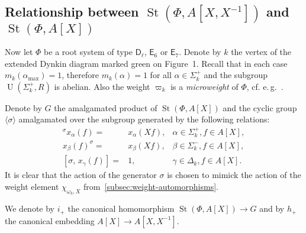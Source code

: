 \documentclass[oneside, 10pt]{amsart}
\DeclareMathOperator{\St}{St}
\DeclareMathOperator{\UU}{U}
\newcommand{\rD}{\mathsf{D}}
\newcommand{\rE}{\mathsf{E}}
\newcommand{\inv}{^{-1}}
\numberwithin{equation}{section}
\numberwithin{thm}{section}
\numberwithin{lemma}{section}
\theoremstyle{definition}
\theoremstyle{remark}
\begin{document}
\subsection{Relationship between \texorpdfstring{$\St(\Phi, A[X, X\inv])$}{St(Ф, A[X, X⁻¹])} and \texorpdfstring{$\St(\Phi, A[X])$}{St(Ф, A[X])}} \label{subsec:short-presentation}
Now let $\Phi$ be a root system of type $\rD_\ell$, $\rE_6$ or $\rE_7$.
Denote by $k$ the vertex of the extended Dynkin diagram marked green on Figure~1.
Recall that in each case $m_k(\alpha_\mathrm{\max}) = 1$, therefore $m_k(\alpha) = 1$ for all $\alpha \in \Sigma_k^+$ and the subgroup $\UU(\Sigma^+_k, R)$ is abelian.
Also the weight $\varpi_k$ is a \textit{microweight} of $\Phi$, cf. e.\,g.~\cite[\S~2]{Ge17}.

Denote by $G$ the amalgamated product of $\St(\Phi, A[X])$ and the cyclic group $\langle \sigma \rangle$ amalgamated over the subgroup generated by the following relations:
\begin{align}
{}^\sigma x_{\alpha}(f) = & x_{\alpha} (Xf), & \alpha \in \Sigma^+_k, f \in A[X], \label{eq:sigma-sigma-plus} \\
x_{\beta}(f)^ \sigma     =& x_{\beta} (Xf), & \beta \in \Sigma^-_k, f \in A[X], \label{eq:sigma-sigma-minus} \\
[\sigma,\, x_\gamma(f)]   =& 1, & \gamma \in \Delta_k, f \in A[X]. \label{eq:sigma-delta}
\end{align}
It is clear that the action of the generator $\sigma$ is chosen to mimick the action of the weight element $\chi_{\omega_k, X}$ from~\cref{subsec:weight-automorphisms}.

We denote by $i_+$ the canonical homomorphism $\St(\Phi, A[X]) \to G$ and by $h_+$ the canonical embedding $A[X] \to A[X, X\inv]$.
\end{document}

